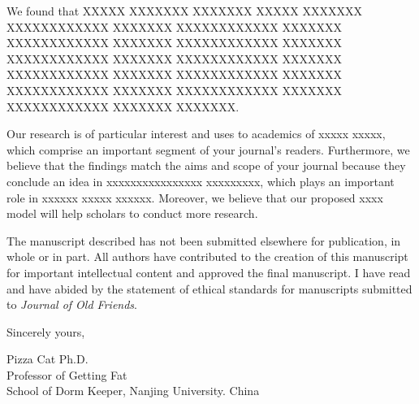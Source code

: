 \documentclass{article}
\begin{document}
We found that XXXXX XXXXXXX XXXXXXX XXXXX XXXXXXX XXXXXXXXXXXX XXXXXXX XXXXXXXXXXXX XXXXXXX XXXXXXXXXXXX XXXXXXX XXXXXXXXXXXX XXXXXXX XXXXXXXXXXXX XXXXXXX XXXXXXXXXXXX XXXXXXX XXXXXXXXXXXX XXXXXXX XXXXXXXXXXXX XXXXXXX XXXXXXXXXXXX XXXXXXX XXXXXXXXXXXX XXXXXXX XXXXXXXXXXXX XXXXXXX XXXXXXX.
 
Our research is of particular interest and uses to academics of xxxxx xxxxx, which comprise an important segment of your journal's readers. Furthermore, we believe that the findings match the aims and scope of your journal because they conclude an idea in xxxxxxxxxxxxxxxx xxxxxxxxx, which plays an important role in xxxxxx xxxxx xxxxxx. Moreover, we believe that our proposed xxxx model will help scholars to conduct more research.

The manuscript described has not been submitted elsewhere for publication, in whole or in part. All authors have contributed to the creation of this manuscript for important intellectual content and approved the final manuscript. I have read and have abided by the statement of ethical standards for manuscripts submitted to \textit{Journal of Old Friends}.

\bigskip %

Sincerely yours,

\vspace{20pt} %

Pizza Cat Ph.D.\\
Professor of Getting Fat\\
School of Dorm Keeper, Nanjing University. China
\end{document}
